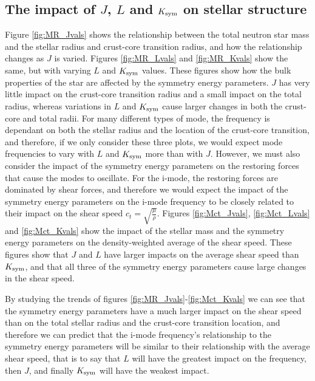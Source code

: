 \documentclass[fleqn,usenatbib]{mnras}
\begin{document}
\subsection{The impact of $J$, $L$ and $K_{\rm sym}$ on stellar structure}\label{sec:stellar_structure}
\hspace{\parindent}Figure \ref{fig:MR_Jvals} shows the relationship between the total neutron star mass and the stellar radius and crust-core transition radius, and how the relationship changes as $J$ is varied. Figures \ref{fig:MR_Lvals} and \ref{fig:MR_Kvals} show the same, but with varying $L$ and $K_{\rm sym}$ values. These figures show how the bulk properties of the star are affected by the symmetry energy parameters. $J$ has very little impact on the crust-core transition radius and a small impact on the total radius, whereas variations in $L$ and $K_{\rm sym}$ cause larger changes in both the crust-core and total radii. For many different types of mode, the frequency is dependant on both the stellar radius and the location of the crust-core transition, and therefore, if we only consider these three plots, we would expect mode frequencies to vary with $L$ and $K_{\rm sym}$ more than with $J$. However, we must also consider the impact of the symmetry energy parameters on the restoring forces that cause the modes to oscillate. For the i-mode, the restoring forces are dominated by shear forces, and therefore we would expect the impact of the symmetry energy parameters on the i-mode frequency to be closely related to their impact on the shear speed $c_t=\sqrt{\frac{\mu}{\rho}}$. Figures \ref{fig:Mct_Jvals}, \ref{fig:Mct_Lvals} and \ref{fig:Mct_Kvals} show the impact of the stellar mass and the symmetry energy parameters on the density-weighted average of the shear speed. These figures show that $J$ and $L$ have larger impacts on the average shear speed than $K_{\rm sym}$, and that all three of the symmetry energy parameters cause large changes in the shear speed.

By studying the trends of figures \ref{fig:MR_Jvals}-\ref{fig:Mct_Kvals} we can see that the symmetry energy parameters have a much larger impact on the shear speed than on the total stellar radius and the crust-core transition location, and therefore we can predict that the i-mode frequency's relationship to the symmetry energy parameters will be similar to their relationship with the average shear speed, that is to say that $L$ will have the greatest impact on the frequency, then $J$, and finally $K_{\rm sym}$ will have the weakest impact.
\end{document}
